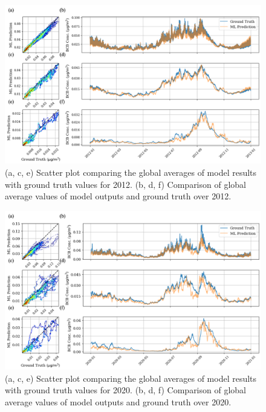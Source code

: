 \documentclass{article}
\begin{document}
    \begin{figure}[htbp]
        \centering
        \includegraphics[width=\linewidth]{global_average_2012.png}
        \caption{(a, c, e) Scatter plot comparing the global averages of model results with ground truth values for 2012. (b, d, f) Comparison of global average values of model outputs and ground truth over 2012.}
        \label{fig:global_average_2012}
    \end{figure}

    \begin{figure}[htbp]
        \centering
        \includegraphics[width=\linewidth]{global_average_2020.png}
        \caption{(a, c, e) Scatter plot comparing the global averages of model results with ground truth values for 2020. (b, d, f) Comparison of global average values of model outputs and ground truth over 2020.}
        \label{fig:global_average_2020}
    \end{figure}
\end{document}
